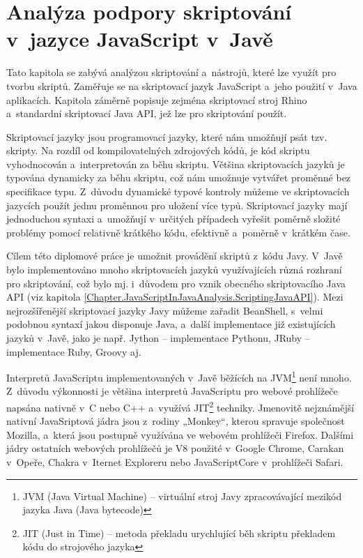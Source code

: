 \chapter{Analýza podpory skriptování v~jazyce JavaScript v~Javě}
\label{Chapter.JavaScriptInJavaAnalysis}

Tato kapitola se zabývá analýzou skriptování a~nástrojů, které lze využít pro tvorbu skriptů. Zaměřuje se na skriptovací jazyk JavaScript a~jeho použití v~Java aplikacích. Kapitola záměrně popisuje zejména skriptovací stroj Rhino a~standardní skriptovací Java API, jež lze pro skriptování použít.

Skriptovací jazyky jsou programovací jazyky, které nám umožňují psát tzv. skripty. Na rozdíl od kompilovatelných zdrojových kódů, je kód skriptu vyhodnocován a~interpretován za běhu skriptu. Většina skriptovacích jazyků je typována dynamicky za běhu skriptu, což nám umožnuje vytvářet proměnné bez specifikace typu. Z~důvodu dynamické typové kontroly můžeme ve skriptovacích jazycích použít jednu proměnnou pro uložení více typů. Skriptovací jazyky mají jednoduchou syntaxi a~umožňují v~určitých případech vyřešit poměrně složité problémy pomocí relativně krátkého kódu, efektivně a~poměrně v~krátkém čase.

Cílem této diplomové práce je umožnit provádění skriptů z~kódu Javy. V~Javě bylo implementováno mnoho skriptovacích jazyků využívajících různá rozhraní pro skriptování, což bylo mj. i~důvodem pro vznik obecného skriptovacího Java API (viz kapitola \ref{Chapter.JavaScriptInJavaAnalysis.ScriptingJavaAPI}). Mezi nejrozšířenější skriptovací jazyky Javy můžeme zařadit BeanShell, s~velmi podobnou syntaxí jakou disponuje Java, a~další implementace již existujících jazyků v~Javě, jako je např. Jython -- implementace Pythonu,  JRuby -- implementace Ruby, Groovy aj.

Interpretů JavaScriptu implementovaných v~Javě běžících na JVM\footnote{JVM  (Java Virtual Machine) -- virtuální stroj Javy zpracovávající mezikód jazyka Java (Java bytecode)} není mnoho. Z~důvodu výkonnosti je většina interpretů JavaScriptu pro webové prohlížeče napsána nativně v~C nebo C++ a~využívá JIT\footnote{JIT (Just in Time) -- metoda překladu urychlující běh skriptu překladem kódu do strojového jazyka} techniky. Jmenovitě nejznámější nativní JavaSriptová jádra jsou z~rodiny „Monkey“, kterou spravuje společnost Mozilla, a~která jsou postupně využívána ve webovém prohlížeči Firefox. Dalšími jádry ostatních webových prohlížečů je V8 použité v~Google Chrome, Carakan v~Opeře, Chakra v~Iternet Exploreru nebo JavaScriptCore v~prohlížeči Safari.

